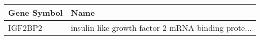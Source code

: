 \begin{tabular}{ll}
\toprule
Gene Symbol &                                               Name \\
\midrule
    IGF2BP2 & insulin like growth factor 2 mRNA binding prote... \\
\bottomrule
\end{tabular}
